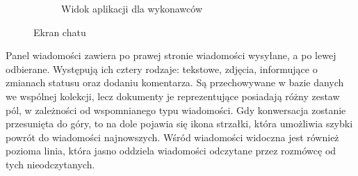 \begin{figure}[ht]
\begin{subfigure}[t]{0.32\textwidth}
    \centering
    \caption{Widok aplikacji dla wykonawców}
  \end{subfigure}
  \caption{Ekran chatu}
  \label{fig:chat}
\end{figure}

Panel wiadomości zawiera po prawej stronie wiadomości wysyłane, a po lewej odbierane. Występują ich cztery rodzaje: tekstowe, zdjęcia, informujące o zmianach statusu oraz dodaniu komentarza. Są przechowywane w bazie danych we wspólnej kolekcji, lecz dokumenty je reprezentujące posiadają różny zestaw pól, w zależności od wspomnianego typu wiadomości.
Gdy konwersacja zostanie przesunięta do góry, to na dole pojawia się ikona strzałki, która umożliwia szybki powrót do wiadomości najnowszych. Wśród wiadomości widoczna jest również pozioma linia, która jasno oddziela wiadomości odczytane przez rozmówcę od tych nieodczytanych.


